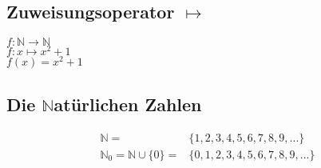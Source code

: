 \documentclass[a4paper]{scrartcl}
\begin{document}
\subsection{Zuweisungsoperator $\mapsto $}
$f: \mathbb{N} \rightarrow \mathbb{N}$ \\
$f: x \mapsto x^2+1$ \\
$f(x) = x^2+1$ \\


\subsection[Die Natürlichen Zahlen]{Die $\mathbb{N}$atürlichen Zahlen }
\begin{align}
\mathbb{N} = & \{ 1 , 2 , 3 , 4 , 5 , 6 , 7 , 8 , 9, ... \}  \\
\mathbb{N}_0 = \mathbb{N} \cup \{0\} =& \{ 0, 1 , 2 , 3 , 4 , 5 , 6 , 7 , 8 , 9, ... \}
\end{align}
\end{document}
